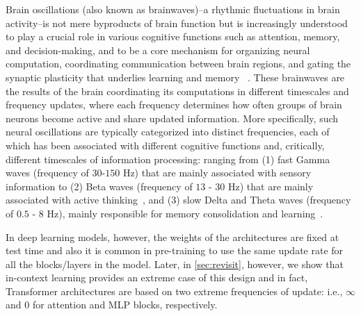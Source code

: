  Brain oscillations (also known as brainwaves)–a rhythmic fluctuations in brain activity–is not mere byproducts of brain function but is increasingly understood to play a crucial role in various cognitive functions such as attention, memory, and decision-making, and to be a core mechanism for organizing neural computation, coordinating communication between brain regions, and gating the synaptic plasticity that underlies learning and memory ~\citep{fries2015rhythms, fell2011role, cavanagh2014frontal}. These brainwaves are the results of the brain coordinating its computations in different timescales and frequency updates, where each frequency determines how often groups of brain neurons become active and share updated information.
More specifically, such neural oscillations are typically categorized into distinct frequencies, each of which has been associated with different cognitive functions and, critically, different timescales of information processing: ranging from (1) fast Gamma waves (frequency of $30$-$150$ Hz) that are mainly associated with sensory information to (2) Beta waves (frequency of $13$ - $30$ Hz) that are mainly associated with active thinking~\citep{buzsaki2004neuronal,BuschmanMiller2007Science,Lundqvist2016Neuron}, and (3) slow Delta and Theta waves (frequency of $0.5$ - $8$ Hz), mainly responsible for memory consolidation and learning~\citep{DiekelmannBorn2010NRN,Marshall2006Nature,Ngo2013Neuron,Staresina2015NatNeuro,Heusser2016NatNeuro,Daume2024Nature}. 

In deep learning models, however, the weights of the architectures are fixed at test time and also it is common in pre-training to use the same update rate for all the blocks/layers in the model. Later, in \autoref{sec:revisit}, however, we show that in-context learning provides an extreme case of this design and in fact, Transformer architectures are based on two extreme frequencies of update: i.e., $\infty$ and $0$ for attention and MLP blocks, respectively.   








